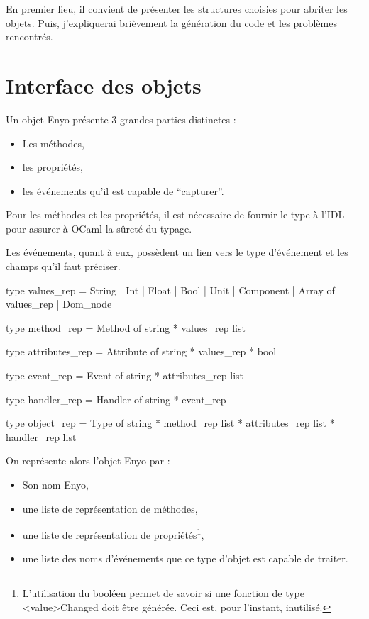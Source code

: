 \documentclass[11pt,a4paper]{report}
\begin{document}
En premier lieu, il convient de présenter les structures choisies pour abriter les objets.
Puis, j'expliquerai brièvement la génération du code et les problèmes rencontrés.

\section{Interface des objets}

Un objet Enyo présente 3 grandes parties distinctes :
\begin{itemize}
  \item Les méthodes,
  \item les propriétés,
  \item les événements qu'il est capable de ``capturer''.
\end{itemize}

Pour les méthodes et les propriétés, il est nécessaire de fournir le type à l'IDL pour assurer à
OCaml la sûreté du typage.

Les événements, quant à eux, possèdent un lien vers le type d'événement et les champs qu'il faut préciser.

\begin{OCaml}
type values_rep =  String | Int | Float | Bool | Unit 
		   | Component | Array of values_rep | Dom_node

type method_rep = Method of string * values_rep list

type attributes_rep = Attribute of string * values_rep * bool

type event_rep = Event of string * attributes_rep list

type handler_rep = Handler of string * event_rep

type object_rep = Type of string * method_rep list * attributes_rep list * handler_rep list
\end{OCaml}

On représente alors l'objet Enyo par :
\begin{itemize}
\item Son nom Enyo,
\item une liste de représentation de méthodes,
\item une liste de représentation de propriétés\footnote{L'utilisation du booléen permet de savoir si 
une fonction de type <value>Changed doit être générée. Ceci est, pour l'instant, inutilisé.},
\item une liste des noms d'événements que ce type d'objet est capable de traiter.
\end{itemize}
\end{document}
